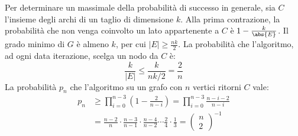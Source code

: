 \documentclass[\main/main.tex]{subfiles}
\begin{document}
\begin{multicols}{2}
\begin{analysis}
    Per determinare un massimale della probabilità di successo in generale, sia \(C\) l'insieme degli archi di un taglio di dimensione \(k\). Alla prima contrazione, la probabilità che non venga coinvolto un lato appartenente a \(C\) è \(1- \frac{k}{\abs{E}}\). Il grado minimo di \(G\) è almeno \(k\), per cui \(|E| \geq \frac{nk}{2}\). La probabilità che l'algoritmo, ad ogni data iterazione, scelga un nodo da \(C\) è:
    \[
        \frac{k}{|E|} \leq \frac{k}{n k / 2}=\frac{2}{n}
    \]
    La probabilità \(p_n\) che l'algoritmo su un grafo con \(n\) vertici ritorni \(C\) vale:
    \begin{align*}
        p_{n} &\geq \prod_{i=0}^{n-3}\left(1-\frac{2}{n-i}\right)=\prod_{i=0}^{n-3} \frac{n-i-2}{n-i}\\
        &=\frac{n-2}{n} \cdot \frac{n-3}{n-1} \cdot \frac{n-4}{n-2} \cdots \frac{2}{4} \cdot \frac{1}{3}=\left(\begin{array}{l}{n} \\ {2}\end{array}\right)^{-1}        
    \end{align*}
\end{analysis}
\end{multicols}
\end{document}

